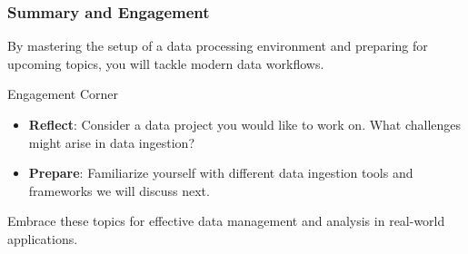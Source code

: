 \documentclass{beamer}
\begin{document}
\begin{frame}[fragile]
    \frametitle{Summary and Engagement}
    By mastering the setup of a data processing environment and preparing for upcoming topics, you will tackle modern data workflows.

    \begin{block}{Engagement Corner}
        \begin{itemize}
            \item \textbf{Reflect}: Consider a data project you would like to work on. What challenges might arise in data ingestion?
            \item \textbf{Prepare}: Familiarize yourself with different data ingestion tools and frameworks we will discuss next.
        \end{itemize}
    \end{block}

    Embrace these topics for effective data management and analysis in real-world applications.
\end{frame}
\end{document}
